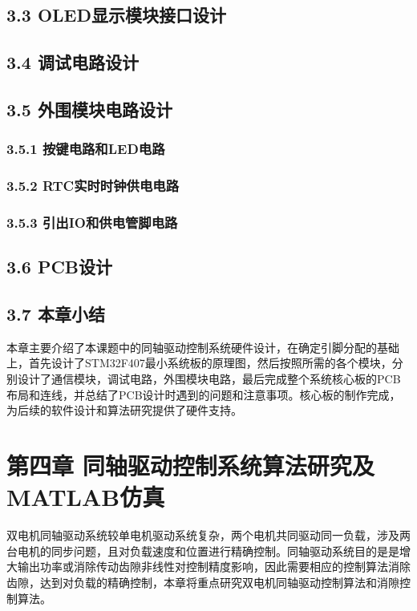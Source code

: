 \documentclass[UTF8,zihao=-4,openany,oneside]{ctexbook}
\begin{document}
\section{3.3 OLED显示模块接口设计}

\section{3.4 调试电路设计}

\section{3.5 外围模块电路设计}

\subsection{3.5.1 按键电路和LED电路}

\subsection{3.5.2 RTC实时时钟供电电路}

\subsection{3.5.3 引出IO和供电管脚电路}

\section{3.6 PCB设计}

\section{3.7 本章小结}

本章主要介绍了本课题中的同轴驱动控制系统硬件设计，在确定引脚分配的基础上，首先设计了STM32F407最小系统板的原理图，然后按照所需的各个模块，分别设计了通信模块，调试电路，外围模块电路，最后完成整个系统核心板的PCB布局和连线，并总结了PCB设计时遇到的问题和注意事项。核心板的制作完成，为后续的软件设计和算法研究提供了硬件支持。

\chapter{第四章 同轴驱动控制系统算法研究及MATLAB仿真}

双电机同轴驱动系统较单电机驱动系统复杂，两个电机共同驱动同一负载，涉及两台电机的同步问题，且对负载速度和位置进行精确控制。同轴驱动系统目的是是增大输出功率或消除传动齿隙非线性对控制精度影响，因此需要相应的控制算法消除齿隙，达到对负载的精确控制，本章将重点研究双电机同轴驱动控制算法和消隙控制算法。
\end{document}
